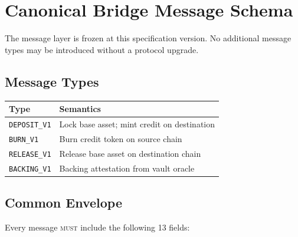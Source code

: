 \section{Canonical Bridge Message Schema}

\label{sec:messages}

The message layer is frozen at this specification version. No additional message types may be introduced without a protocol upgrade.

\subsection{Message Types}

\begin{center}
\begin{tabular}{@{}ll@{}}
\toprule
\textbf{Type} & \textbf{Semantics} \\
\midrule
\texttt{DEPOSIT\_V1}  & Lock base asset; mint credit on destination \\
\texttt{BURN\_V1}     & Burn credit token on source chain \\
\texttt{RELEASE\_V1}  & Release base asset on destination chain \\
\texttt{BACKING\_V1}  & Backing attestation from vault oracle \\
\bottomrule
\end{tabular}
\end{center}

\subsection{Common Envelope}

Every message \textsc{must} include the following 13 fields:

